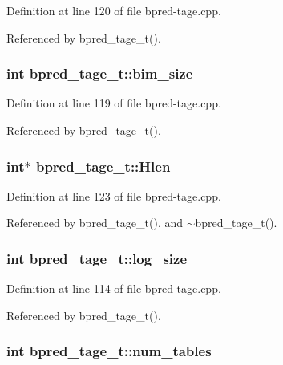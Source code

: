 Definition at line 120 of file bpred-tage.cpp.

Referenced by bpred\_\-tage\_\-t().
\subsubsection[{bim\_\-size}]{\setlength{\rightskip}{0pt plus 5cm}int {\bf bpred\_\-tage\_\-t::bim\_\-size}\hspace{0.3cm}{\tt  [protected]}}\label{classbpred__tage__t_25276d1c7c367660350f6e3b7b467ba6}




Definition at line 119 of file bpred-tage.cpp.

Referenced by bpred\_\-tage\_\-t().
\subsubsection[{Hlen}]{\setlength{\rightskip}{0pt plus 5cm}int$\ast$ {\bf bpred\_\-tage\_\-t::Hlen}\hspace{0.3cm}{\tt  [protected]}}\label{classbpred__tage__t_30b1533d2d238e59c626734c4a6156aa}




Definition at line 123 of file bpred-tage.cpp.

Referenced by bpred\_\-tage\_\-t(), and $\sim$bpred\_\-tage\_\-t().
\subsubsection[{log\_\-size}]{\setlength{\rightskip}{0pt plus 5cm}int {\bf bpred\_\-tage\_\-t::log\_\-size}\hspace{0.3cm}{\tt  [protected]}}\label{classbpred__tage__t_9a540afa3d0e9732d3b98f1e1ba3a15a}




Definition at line 114 of file bpred-tage.cpp.

Referenced by bpred\_\-tage\_\-t().
\subsubsection[{num\_\-tables}]{\setlength{\rightskip}{0pt plus 5cm}int {\bf bpred\_\-tage\_\-t::num\_\-tables}\hspace{0.3cm}{\tt  [protected]}}\label{classbpred__tage__t_fbc32cdf21deeacd881fe3ee81a635da}





